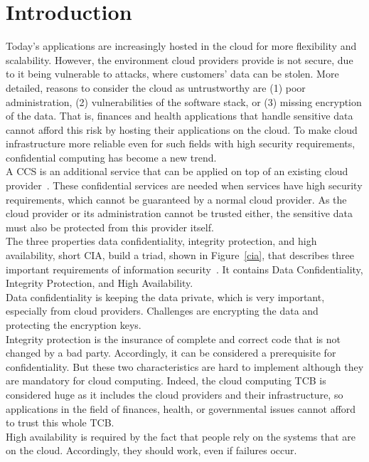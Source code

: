 


\section{Introduction}
Today's applications are increasingly hosted in the cloud for more flexibility and scalability. However, the environment cloud providers provide is not secure, due to it being vulnerable to attacks, where customers' data can be stolen. More detailed, reasons to consider the cloud as untrustworthy are (1) poor administration, (2) vulnerabilities of the software stack, or (3) missing encryption of the data.
  That is, finances and health applications that handle sensitive data cannot afford this risk by hosting their applications on the cloud. To make cloud infrastructure more reliable even for such fields with high security requirements, confidential computing has become a new trend.\\
 A CCS is an additional service that can be applied on top of an existing cloud provider~\cite{confidentiality}. These confidential services are needed when services have high security requirements, which cannot be guaranteed by a normal cloud provider. As the cloud provider or its administration cannot be trusted either, the sensitive data must also be protected from this provider itself. \\
 The three properties data confidentiality, integrity protection, and high availability, short CIA, build a triad,  shown in Figure~\ref{cia},  that describes three important requirements of information security~\cite{ciaBook, cia}. It contains Data Confidentiality, Integrity Protection, and High Availability.\\
 Data confidentiality is keeping the data private, which is very important, especially from cloud providers. Challenges are encrypting the data and protecting the encryption keys.\\
 Integrity protection is the insurance of complete and correct code that is not changed by a bad party. Accordingly, it can be considered a prerequisite for confidentiality. But these two characteristics are hard to implement although they are mandatory for cloud computing. Indeed, the cloud computing TCB  is considered huge as it includes the cloud providers and their infrastructure, so applications in the field of finances, health, or governmental issues cannot afford to trust this whole TCB.\\
 High availability is required by the fact that people rely on the systems that are on the cloud. Accordingly, they should work, even if failures occur.\\
